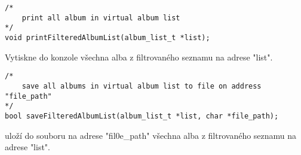\begin{lstlisting}[style=CStyle]
/*
	print all album in virtual album list
*/
void printFilteredAlbumList(album_list_t *list);
\end{lstlisting}
Vytiskne do konzole všechna alba z filtrovaného seznamu na adrese "list".

\begin{lstlisting}[style=CStyle]
/*
    save all albums in virtual album list to file on address "file_path"
*/
bool saveFilteredAlbumList(album_list_t *list, char *file_path);
\end{lstlisting}
uloží do souboru na adrese "fil0e\_path" všechna alba z filtrovaného seznamu na adrese "list".
